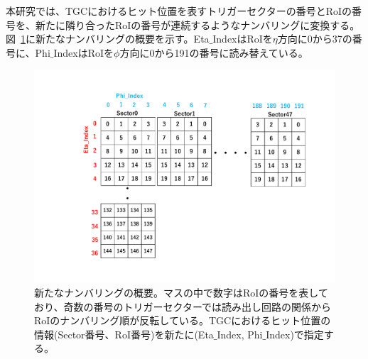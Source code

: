 本研究では、TGCにおけるヒット位置を表すトリガーセクターの番号とRoIの番号を、新たに隣り合ったRoIの番号が連続するようなナンバリングに変換する。
図~\ref{fig:newnumbering}に新たなナンバリングの概要を示す。Eta$\_$IndexはRoIを$\eta$方向に0から37の番号に、Phi$\_$IndexはRoIを$\phi$方向に0から191の番号に読み替えている。
\begin{figure}[tb]
  \centering
  \hspace*{-1cm}
  \includegraphics[clip, width=14cm]{fig/4/new_numbering.pdf}
  \caption{新たなナンバリングの概要。マスの中で数字はRoIの番号を表しており、奇数の番号のトリガーセクターでは読み出し回路の関係からRoIのナンバリング順が反転している。TGCにおけるヒット位置の情報(Sector番号、RoI番号)を新たに(Eta$\_$Index, Phi$\_$Index)で指定する。}
  \label{fig:newnumbering}
\end{figure}

